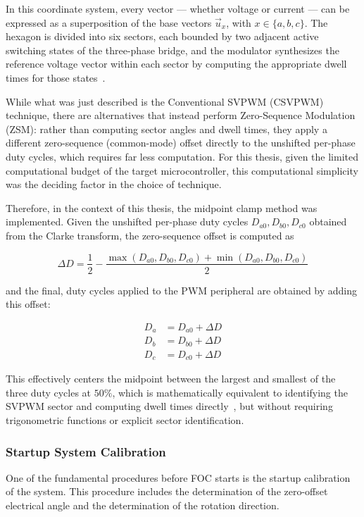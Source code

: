 In this coordinate system, every vector --- whether voltage or current --- can be expressed as a superposition of the base vectors $\vec{u}_x$, with $x \in \{a, b, c\}$. The hexagon is divided into six sectors, each bounded by two adjacent active switching states of the three-phase bridge, and the modulator synthesizes the reference voltage vector within each sector by computing the appropriate dwell times for those states~\cite{vanderbroeck1988pwm}.

While what was just described is the Conventional SVPWM (CSVPWM) technique, there are alternatives that instead perform Zero-Sequence Modulation (ZSM): rather than computing sector angles and dwell times, they apply a different zero-sequence (common-mode) offset directly to the unshifted per-phase duty cycles, which requires far less computation. For this thesis, given the limited computational budget of the target microcontroller, this computational simplicity was the deciding factor in the choice of technique.

Therefore, in the context of this thesis, the midpoint clamp method was implemented. Given the unshifted per-phase duty cycles $D_{a0}, D_{b0}, D_{c0}$ obtained from the Clarke transform, the zero-sequence offset is computed as

\begin{equation}
    \Delta D = \frac{1}{2} - \frac{\max(D_{a0}, D_{b0}, D_{c0}) + \min(D_{a0}, D_{b0}, D_{c0})}{2}
    \label{eq:midpoint-clamp}
\end{equation}

and the final, duty cycles applied to the PWM peripheral are obtained by adding this offset:

\begin{align}
    D_a &= D_{a0} + \Delta D \\
    D_b &= D_{b0} + \Delta D \\
    D_c &= D_{c0} + \Delta D
\end{align}

This effectively centers the midpoint between the largest and smallest of the three duty cycles at $50\%$, which is mathematically equivalent to identifying the SVPWM sector and computing dwell times directly~\cite{microchip2024zsm}, but without requiring trigonometric functions or explicit sector identification.

\subsubsection{Startup System Calibration}
One of the fundamental procedures before FOC starts is the startup calibration of the system. This procedure includes the determination of the zero-offset electrical angle and the determination of the rotation direction.

